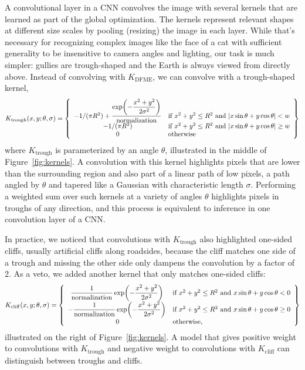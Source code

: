 A convolutional layer in a CNN convolves the image with several kernels that are learned as part of the global optimization. The kernels represent relevant shapes at different size scales by pooling (resizing) the image in each layer. While that's necessary for recognizing complex images like the face of a cat with sufficient generality to be insensitive to camera angles and lighting, our task is much simpler: gullies are trough-shaped and the Earth is always viewed from directly above. Instead of convolving with $K_{\mathrm{DFME}}$, we can convolve with a trough-shaped kernel,
\[
K_{\mathrm{trough}}(x,y;\theta, \sigma)=
\left\{\begin{array}{c l}
-1/(\pi R^2)
+\dfrac{\exp\!\left(-\dfrac{x^2+y^2}{2\sigma^2}\right)}
{\text{normalization}}
& \text{if } x^2+y^2\le R^2 \text{ and } |x\sin\theta+y\cos\theta|<w \\
-1/(\pi R^2)
& \text{if } x^2+y^2\le R^2 \text{ and } |x\sin\theta+y\cos\theta|\ge w \\
0
& \text{otherwise}
\end{array}\right\}
\]
where $K_{\mathrm{trough}}$ is parameterized by an angle $\theta$, illustrated in the middle of Figure~\ref{fig:kernels}. A convolution with this kernel highlights pixels that are lower than the surrounding region and also part of a linear path of low pixels, a path angled by $\theta$ and tapered like a Gaussian with characteristic length $\sigma$. Performing a weighted sum over such kernels at a variety of angles $\theta$ highlights pixels in troughs of any direction, and this process is equivalent to inference in one convolution layer of a CNN.

In practice, we noticed that convolutions with $K_{\mathrm{trough}}$ also highlighted one-sided cliffs, usually artificial cliffs along roadsides, because the cliff matches one side of a trough and missing the other side only dampens the convolution by a factor of 2. As a veto, we added another kernel that only matches one-sided cliffs:
\[
K_{\mathrm{cliff}}(x,y;\theta, \sigma)=
\left\{\begin{array}{c l}
\dfrac{1}{\text{normalization}} \, {\exp\!\left(-\dfrac{x^2+y^2}{2\sigma^2}\right)}
& \text{if } x^2+y^2\le R^2 \text{ and } x\sin\theta+y\cos\theta < 0 \\
-\dfrac{1}{\text{normalization}} \, {\exp\!\left(-\dfrac{x^2+y^2}{2\sigma^2}\right)}
& \text{if } x^2+y^2\le R^2 \text{ and } x\sin\theta+y\cos\theta \ge 0 \\
 \, 0
& \text{otherwise,}
\end{array}\right\}
\]
illustrated on the right of Figure~\ref{fig:kernels}. A model that gives positive weight to convolutions with $K_{\mathrm{trough}}$ and negative weight to convolutions with $K_{\mathrm{cliff}}$ can distinguish between troughs and cliffs.

